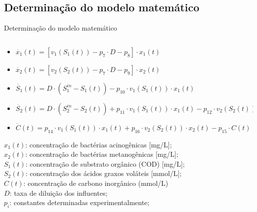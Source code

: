 \documentclass[10pt]{beamer}
\begin{document}
\subsection{Determinação do modelo matemático}
\begin{frame}[fragile]{Determinação do modelo matemático}

\begin{columns}
\begin{column}{0.65\textwidth}
\begin{itemize}[<+- | alert@+>]
\item $\dot{x_{1}}(t)=[v_{1}(S_{1}(t))-p_7 \cdot D - p_8]\cdot x_1(t)$\\
\item $\dot{x_{2}}(t)=[v_{2}(S_{2}(t))-p_7 \cdot D - p_9]\cdot x_2(t)$\\
\item $\dot{S_{1}}(t)=D\cdot(S_{1}^{in} - S_{1}(t)) - p_{10} \cdot v_{1}(S_{1}(t))\cdot x_1(t)$\\
\item $\dot{S_{2}}(t)=D \cdot (S_{2}^{in} - S_{2}(t)) + p_{11}\cdot v_{1}(S_{1}(t)) \cdot x_1(t) - p_{12} \cdot v_{2}(S_{2}(t)) \cdot x_2(t) $\\
\item $\dot{C}(t)= p_{14} \cdot v_{1}(S_{1}(t)) \cdot {x_{1}}(t) + p_{16} \cdot v_{2}(S_{2}(t)) \cdot {x_{2}}(t) - p_{15} \cdot C(t) $\\
\end{itemize}

\vspace{10pt}
\begin{footnotesize}
$x_1(t)$: concentração de bactérias acinogênicas [mg/L]; \\
$x_2(t)$: concentração de bactérias metanogênicas [mg/L];\\
$S_1(t)$: concentração de substrato orgânico (COD) [mg/L];\\
$S_2(t)$: concentração dos ácidos graxos voláteis [mmol/L];\\
$C(t)$: concentração de carbono inorgânico (mmol/L)\\
$D$: taxa de diluição dos influentes;\\
$p_i$: constantes determinadas experimentalmente;\\
\end{footnotesize}
\end{column}


\end{columns}
\end{frame}
\end{document}
